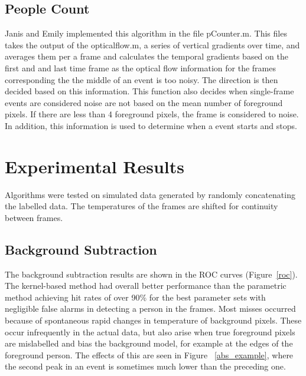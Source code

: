 \documentclass[12pt,oneside]{article} %
\begin{document}
\subsection{People Count}
Janis and Emily implemented this algorithm in the file pCounter.m. This files takes the output of the opticalflow.m, a series of vertical gradients over time, and averages them per a frame and calculates the temporal gradients based on the first and and last time frame as the optical flow information for the frames corresponding the the middle of an event is too noisy. The direction is then decided based on this information. This function also decides when single-frame events are considered noise are not based on the mean number of foreground pixels. If there are less than 4 foreground pixels, the frame is considered to noise. In addition, this information is used to determine when a event starts and stops.

\section{Experimental Results}  %
Algorithms were tested on simulated data generated by randomly concatenating the labelled data.
The temperatures of the frames are shifted for continuity between frames. 

\subsection{Background Subtraction}  %
The background subtraction results are shown in the ROC curves (Figure~\ref{roc}).
The kernel-based method
had overall better performance than the parametric method achieving hit rates of over 90\% for the best
parameter sets with negligible false alarms in detecting a person in the frames. Most misses occurred
because of spontaneous rapid changes in temperature of background pixels. These occur infrequently
in the actual data, but also arise when true foreground pixels are mislabelled and bias the background model, for 
example at the edges of the foreground person. The effects of this are seen in Figure~ \ref{abs_example}, where
the second peak in an event is sometimes much lower than the preceding one.
\end{document}
